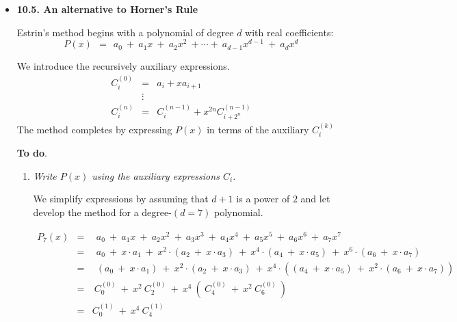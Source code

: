 
\begin{itemize}
\item {\bf 10.5. An alternative to Horner's Rule}

\smallskip

Estrin's method begins with a polynomial of degree $d$ with real coefficients:
\[
P(x) \ \ = \ \ a_0 \ + \ a_1 x \ + \ a_2 x^2 \ + \cdots + \ a_{d-1} x^{d-1} \ + \ a_d x^d
\]

We introduce the recursively auxiliary expressions.  
\begin{eqnarray*}
C_i^{(0)} & = & a_i + x a_{i+1} \\
                &\vdots &  \\
C_i^{(n)}  & = & C_i^{(n-1)} + x^{2n} C_{i+2^n}^{(n-1)}
\end{eqnarray*}
The method completes by expressing $P(x)$ in terms of the auxiliary $C_i^{(k)}$
\medskip

{\bf To do}.
\begin{enumerate}
\item
{\em Write $P(x)$ using the auxiliary expressions $C_i$.}  

\smallskip

We simplify expressions by assuming that $d+1$ is a power of $2$
and let develop the method for a degree-$(d=7)$ polynomial.

\begin{eqnarray*}
P_7(x) & = & \ \ a_0 \ + \ a_1 x \ + \ a_2 x^2 \ +  \ a_{3} x^{3} \ + \ a_4 x^4 \ + \ a_{5} x^{5} \ + \ a_{6} x^{6} \ + \ a_7 x^7 \\
& = & \ \ a_0 \ + \ x \cdot a_1 \ + \ x^2 \cdot (a_2  \ + \ x \cdot a_3) \ + \ x^4 \cdot (a_4  \ + \ x \cdot a_5) \ +  \ x^6 \cdot (a_6  \ + \ x \cdot a_7)\\
& = & \ \ (a_0 \ + \ x \cdot a_1) \ + \ x^2 \cdot (a_2  \ + \ x \cdot a_3) \ + \ x^4 \cdot \left( (a_4 \ + \ x \cdot a_5) \ + \ x^2 \cdot (a_6  \ + \ x \cdot a_7) \right) \\
& = & \ C_{0}^{(0)} \ + \ x^2 \ C_2^{(0)} \ + \ x^4 \ ( \ C_4^{(0)} \ + \ x^2 \ C_{6}^{(0)} \ ) \\
& = & C_0^{(1)} \ + \ x^4 \ C_4^{(1)} 
\end{eqnarray*}


\end{enumerate}
\end{itemize}

